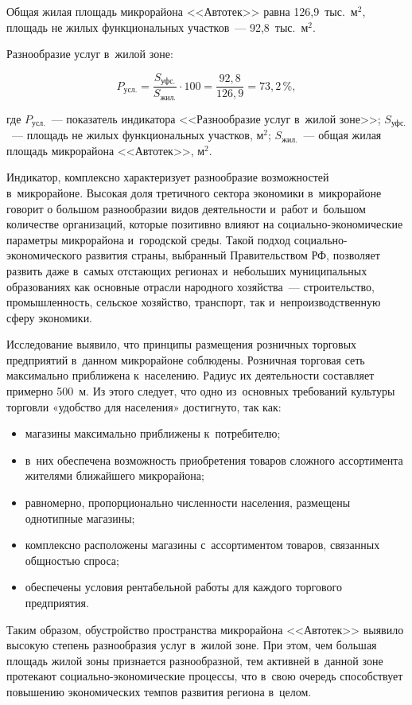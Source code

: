 Общая жилая площадь микрорайона <<Автотек>> равна 126,9~тыс.~м$^2$, площадь не жилых функциональных участков~--- 92,8~тыс.~м$^2$.

Разнообразие услуг в~жилой зоне:

$$ P_{\text{усл.}} = \frac{S_{\text{уфс.}}}{S_{\text{жил.}}}\cdot100 = \frac{92,8}{126,9} = 73,2\,\%,$$

где $P_{\text{усл.}}$~--- показатель индикатора <<Разнообразие услуг в~жилой зоне>>;
$S_{\text{уфс.}}$~--- площадь не жилых функциональных участков, м$^2$;
$S_{\text{жил.}}$~--- общая жилая площадь микрорайона <<Автотек>>, м$^2$.

Индикатор, комплексно характеризует разнообразие возможностей в~микрорайоне. Высокая доля третичного сектора экономики в~микрорайоне говорит о большом разнообразии видов деятельности и~работ и~большом количестве организаций, которые позитивно влияют на социально-экономические параметры микрорайона и~городской среды. Такой подход социально-экономического развития страны, выбранный Правительством РФ, позволяет развить даже в~самых отстающих регионах и~небольших муниципальных образованиях как основные отрасли народного хозяйства~--- строительство, промышленность, сельское хозяйство, транспорт, так и~непроизводственную сферу экономики.

Исследование выявило, что принципы размещения розничных торговых предприятий в~данном микрорайоне соблюдены. Розничная торговая сеть максимально приближена к~населению. Радиус их деятельности составляет примерно 500~м. Из этого следует, что одно из~основных требований культуры торговли «удобство для населения» достигнуто, так как:
\begin{itemize}[noitemsep]\vspace{-8pt}
\item магазины максимально приближены к~потребителю;
\item в~них обеспечена возможность приобретения товаров сложного ассортимента жителями ближайшего микрорайона;
\item равномерно, пропорционально численности населения, размещены однотипные магазины;
\item комплексно расположены магазины с~ассортиментом товаров, связанных общностью спроса;
\item обеспечены условия рентабельной работы для каждого торгового предприятия.
\end{itemize}\vspace{-8pt}

Таким образом, обустройство пространства микрорайона <<Автотек>> выявило высокую степень разнообразия услуг в~жилой зоне. При этом, чем большая площадь жилой зоны признается разнообразной, тем активней в~данной зоне протекают социально-экономические процессы, что в~свою очередь способствует повышению экономических темпов развития региона в~целом.


